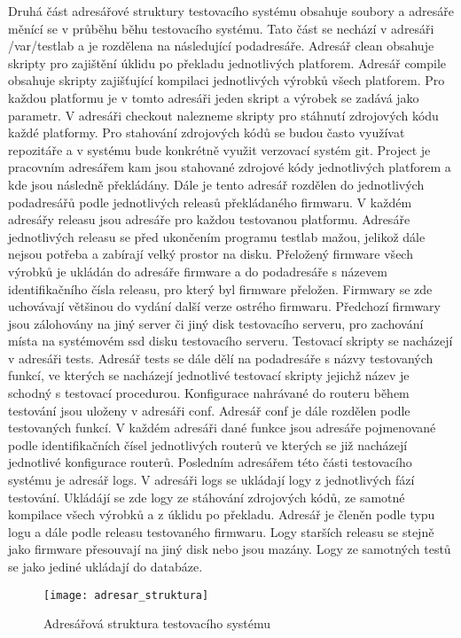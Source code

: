 Druhá část adresářové struktury testovacího systému obsahuje soubory a adresáře měnící se v průběhu běhu testovacího systému. Tato část se nechází v adresáři /var/testlab a je rozdělena na následující podadresáře. Adresář clean obsahuje skripty pro zajištění úklidu po překladu jednotlivých platforem. Adresář compile obsahuje skripty zajišťující kompilaci jednotlivých výrobků všech platforem. Pro každou platformu je v tomto adresáři jeden skript a výrobek se zadává jako parametr. V adresáři checkout nalezneme skripty pro stáhnutí zdrojových kódu každé platformy. Pro stahování zdrojových kódů se budou často využívat repozitáře a v systému bude konkrétně využit verzovací systém git. Project je pracovním adresářem kam jsou stahované zdrojové kódy jednotlivých platforem a kde jsou následně překládány. Dále je tento adresář rozdělen do jednotlivých podadresářů podle jednotlivých releasů překládaného firmwaru. V každém adresářy releasu jsou adresáře pro každou testovanou platformu. Adresáře jednotlivých releasu se před ukončením programu testlab mažou, jelikož dále nejsou potřeba a zabírají velký prostor na disku. Přeložený firmware všech výrobků je ukládán do adresáře firmware a do podadresáře s názevem identifikačního čísla releasu, pro který byl firmware přeložen. Firmwary se zde uchovávají většinou do vydání další verze ostrého firmwaru. Předchozí firmwary jsou zálohovány na jiný server či jiný disk testovacího serveru, pro zachování místa na systémovém ssd disku testovacího serveru. Testovací skripty se nacházejí v adresáři tests. Adresář tests se dále dělí na podadresáře s názvy testovaných funkcí, ve kterých se nacházejí jednotlivé testovací skripty jejichž název je schodný s testovací procedurou. Konfigurace nahrávané do routeru během testování jsou uloženy v adresáři conf. Adresář conf je dále rozdělen podle testovaných funkcí. V každém adresáři dané funkce jsou adresáře pojmenované podle identifikačních čísel jednotlivých routerů ve kterých se již nacházejí jednotlivé konfigurace routerů. Posledním adresářem této části testovacího systému je adresář logs. V adresáři logs se ukládají logy z jednotlivých fází testování. Ukládájí se zde logy ze stáhování zdrojových kódů, ze samotné kompilace všech výrobků a z úklidu po překladu. Adresář je členěn podle typu logu a dále podle releasu testovaného firmwaru. Logy starších releasu se stejně jako firmware přesouvají na jiný disk nebo jsou mazány. Logy ze samotných testů se jako jediné ukládají do databáze.

\begin{figure}[h]
  \centering
  \texttt{[image: adresar\_struktura]}
  \caption{Adresářová struktura testovacího systému}
  \label{fig:adresar_struktura}
\end{figure}

